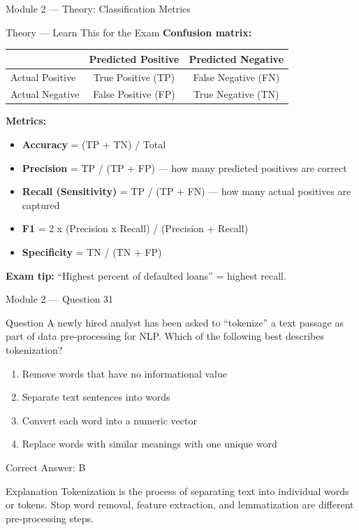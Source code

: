 \documentclass[aspectratio=169,10pt]{beamer}
\newcommand{\question}[1]{%
	\begin{block}{Question}
		#1
	\end{block}
}
\newcommand{\options}[4]{%
	\begin{enumerate}[label=\Alph*.,leftmargin=*]
		\item #1
		\item #2
		\item #3
		\item #4
	\end{enumerate}
}
\newcommand{\answerbox}[1]{%
	\begin{exampleblock}{Correct Answer: #1}
	\end{exampleblock}
}
\newcommand{\explain}[1]{%
	\begin{block}{Explanation}
		\small #1
	\end{block}
}
\newcommand{\theory}[1]{%
	\begin{block}{Theory --- Learn This for the Exam}
		\small #1
	\end{block}
}
\begin{document}
	\begin{frame}{Module 2 --- Theory: Classification Metrics}
		\theory{
			\textbf{Confusion matrix:}
			\begin{center}
				\small
				\begin{tabular}{@{}lcc@{}}
					\toprule
					& Predicted Positive & Predicted Negative \\
					\midrule
					Actual Positive & True Positive (TP) & False Negative (FN) \\
					Actual Negative & False Positive (FP) & True Negative (TN) \\
					\bottomrule
				\end{tabular}
			\end{center}
			\textbf{Metrics:}
			\begin{itemize}
				\item \textbf{Accuracy} = (TP + TN) / Total
				\item \textbf{Precision} = TP / (TP + FP) --- how many predicted positives are correct
				\item \textbf{Recall (Sensitivity)} = TP / (TP + FN) --- how many actual positives are captured
				\item \textbf{F1} = 2 x (Precision x Recall) / (Precision + Recall)
				\item \textbf{Specificity} = TN / (TN + FP)
			\end{itemize}
			\textbf{Exam tip:} ``Highest percent of defaulted loans'' = highest recall.
		}
	\end{frame}
	
	\begin{frame}{Module 2 --- Question 31}
		\question{A newly hired analyst has been asked to ``tokenize'' a text passage as part of data pre-processing for NLP. Which of the following best describes tokenization?}
		\options{Remove words that have no informational value}{Separate text sentences into words}{Convert each word into a numeric vector}{Replace words with similar meanings with one unique word}
		\answerbox{B}
		\explain{Tokenization is the process of separating text into individual words or tokens. Stop word removal, feature extraction, and lemmatization are different pre-processing steps.}
	\end{frame}
	
\end{document}
